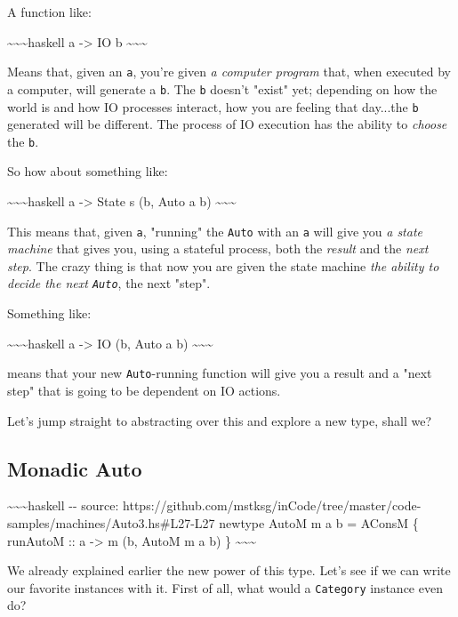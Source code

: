 \documentclass[]{article}
\begin{document}
A function like:

\textasciitilde{}\textasciitilde{}\textasciitilde{}haskell a -\textgreater{} IO
b \textasciitilde{}\textasciitilde{}\textasciitilde{}

Means that, given an \texttt{a}, you're given \emph{a computer program} that,
when executed by a computer, will generate a \texttt{b}. The \texttt{b} doesn't
"exist" yet; depending on how the world is and how IO processes interact, how
you are feeling that day...the \texttt{b} generated will be different. The
process of IO execution has the ability to \emph{choose} the \texttt{b}.

So how about something like:

\textasciitilde{}\textasciitilde{}\textasciitilde{}haskell a -\textgreater{}
State s (b, Auto a b) \textasciitilde{}\textasciitilde{}\textasciitilde{}

This means that, given \texttt{a}, "running" the \texttt{Auto} with an
\texttt{a} will give you \emph{a state machine} that gives you, using a stateful
process, both the \emph{result} and the \emph{next step}. The crazy thing is
that now you are given the state machine \emph{the ability to decide the next
\texttt{Auto}}, the next "step".

Something like:

\textasciitilde{}\textasciitilde{}\textasciitilde{}haskell a -\textgreater{} IO
(b, Auto a b) \textasciitilde{}\textasciitilde{}\textasciitilde{}

means that your new \texttt{Auto}-running function will give you a result and a
"next step" that is going to be dependent on IO actions.

Let's jump straight to abstracting over this and explore a new type, shall we?

\subsection{Monadic Auto}

\textasciitilde{}\textasciitilde{}\textasciitilde{}haskell -\/- source:
https://github.com/mstksg/inCode/tree/master/code-samples/machines/Auto3.hs\#L27-L27
newtype AutoM m a b = AConsM \{ runAutoM :: a -\textgreater{} m (b, AutoM m a b)
\} \textasciitilde{}\textasciitilde{}\textasciitilde{}

We already explained earlier the new power of this type. Let's see if we can
write our favorite instances with it. First of all, what would a
\texttt{Category} instance even do?
\end{document}
